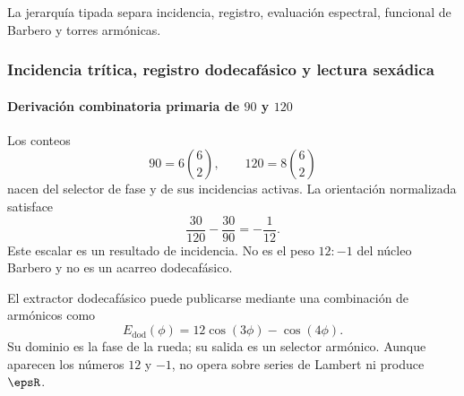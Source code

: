 \noindent La jerarquía tipada separa incidencia, registro, evaluación espectral, funcional de Barbero y torres armónicas.\par\medskip

\subsubsection{Incidencia trítica, registro dodecafásico y lectura sexádica}

\paragraph{Derivación combinatoria primaria de \(90\) y \(120\)}

Los conteos
\[
90=6\binom62,
\qquad
120=8\binom62
\]
nacen del selector de fase y de sus incidencias activas. La orientación
normalizada satisface
\begin{equation}
\frac{30}{120}-\frac{30}{90}=-\frac1{12}.
\label{eq:minus-one-twelve}
\end{equation}
Este escalar es un resultado de incidencia. No es el peso \(12:-1\) del
núcleo Barbero y no es un acarreo dodecafásico.

El extractor dodecafásico puede publicarse mediante una combinación de
armónicos como
\[
E_{\mathrm{dod}}(\phi)=12\cos(3\phi)-\cos(4\phi).
\]
Su dominio es la fase de la rueda; su salida es un selector armónico. Aunque
aparecen los números \(12\) y \(-1\), no opera sobre series de Lambert ni
produce \(\epsR\).

